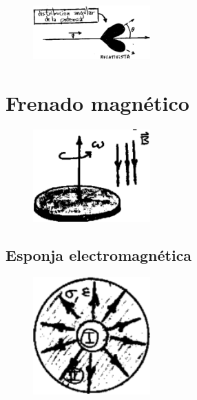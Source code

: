 \documentclass[10pt,oneside]{CBFT_book}
\begin{document}
\begin{figure}[htb]
	\begin{center}
	\includegraphics[width=0.4\textwidth]{images/fig_ft1_frenado3.pdf}	 
	\end{center}
	\caption{}
\end{figure} 

\section{Frenado magnético}

\begin{figure}[htb]
	\begin{center}
	\includegraphics[width=0.4\textwidth]{images/fig_ft1_frenado.pdf}	 
	\end{center}
	\caption{}
\end{figure} 

\subsection{Esponja electromagnética}

\begin{figure}[htb]
	\begin{center}
	\includegraphics[width=0.4\textwidth]{images/fig_ft1_esponja.pdf}	 
	\end{center}
	\caption{}
\end{figure} 

\end{document}
